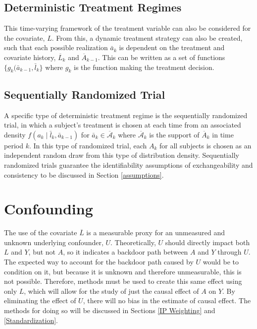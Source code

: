 \subsection{Deterministic Treatment Regimes} 
This time-varying framework of the treatment variable can also be considered for the covariate, $L$.  From this, a dynamic treatment strategy can also be created, such that each possible realization $\bar{a}_{k}$ is dependent on the treatment and covariate history, $\overline{L}_k$ and $\overline{A}_{k-1}$.  This can be written as a set of functions $\{g_k (\bar{a}_{k-1}, \bar{l}_k \}$ where $g_k$ is the function making the treatment decision.  


\subsection{Sequentially Randomized Trial} 
A specific type of deterministic treatment regime is the sequentially randomized trial, in which a subject's treatment is chosen at each time from an associated density $f (a_k \mid \bar{l}_k, \bar{a}_{k-1})$ for $\bar{a}_k \in \overline{\mathcal{A}}_k$ where $\overline{\mathcal{A}}_k$ is the support of $\overline{A}_k$ in time period $k$.\cite{young2011comparative}  In this type of randomized trial, each $A_k$ for all subjects is chosen as an independent random draw from this type of distribution density.  Sequentially randomized trials guarantee the identifiability assumptions of exchangeability and consistency to be discussed in Section \ref{assumptions}.  

\section{Confounding} 

The use of the covariate $\overline{L}$ is a measurable proxy for an unmeasured and unknown underlying confounder, $U$.  Theoretically, $U$ should directly impact both $L$ and $Y$, but not $A$, so it indicates a backdoor path between $A$ and $Y$ through $U$.  \cite{wright2015international}  The expected way to account for the backdoor path caused by $U$ would be to condition on it, but because it is unknown and therefore unmeasurable, this is not possible.  Therefore, methods must be used to create this same effect using only $L$, which will allow for the study of just the causal effect of $A$ on $Y$.  By eliminating the effect of $U$, there will no bias in the estimate of causal effect.  The methods for doing so will be discussed in Sections \ref{IP Weighting} and \ref{Standardization}.  

